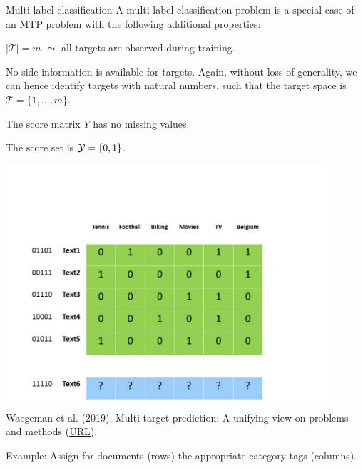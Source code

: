 \documentclass[11pt,compress,t,notes=noshow, xcolor=table]{beamer}
\newcommand{\Tspace}{\mathcal{T}}
\begin{document}
\begin{frame}{Multi-label classification}
	\small
%	 
		A multi-label classification problem is a special case of an MTP problem with the following additional properties: 
		\begin{enumerate} \small
			\item[P5] $|\Tspace|=m$ $\leadsto$ all targets are observed during training. 
%			
			\item[P6] No side information is available for targets. Again, without loss of generality, we can hence identify targets with natural numbers, such that the target space is $\Tspace = \{1,...,m\}$. 
%			

		\begin{minipage}{0.45\textwidth}  
%			
			\item[P7] The score matrix $Y$ has no missing values. 
%			
			\item[P8b] The score set is $\mathcal{Y} = \{0,1\}$. 
%			
		\end{minipage}
		\begin{minipage}{0.45\textwidth}    
		\begin{center}
			\includegraphics[width=0.9\textwidth,trim = 0 0 100 100,clip]{figure/Slide2} \tiny
			\\ Waegeman et al. (2019), Multi-target prediction:
			A unifying view on problems and methods (\href{https://arxiv.org/pdf/1809.02352.pdf}{\underline{URL}}).
		\end{center}
		\end{minipage}
	\end{enumerate}	
%
	Example: Assign for documents (rows) the appropriate category tags (columns).
% 
\end{frame}
\end{document}
